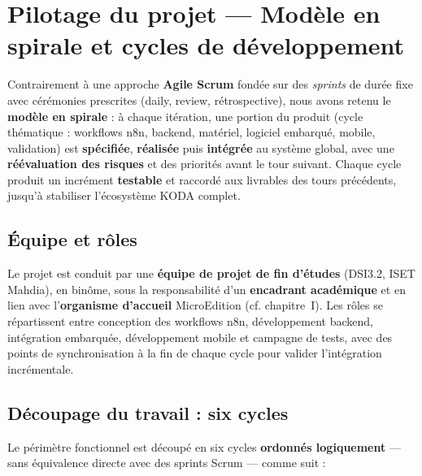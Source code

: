 \documentclass[a4paper,12pt]{report}
\begin{document}
	\section{Pilotage du projet — Modèle en spirale et cycles de développement}
	
	Contrairement à une approche \textbf{Agile Scrum} fondée sur des \textit{sprints}
	de durée fixe avec cérémonies prescrites (daily, review, rétrospective), nous avons
	retenu le \textbf{modèle en spirale} : à chaque itération, une portion du produit
	(cycle thématique : workflows n8n, backend, matériel, logiciel embarqué, mobile,
	validation) est \textbf{spécifiée}, \textbf{réalisée} puis \textbf{intégrée} au
	système global, avec une \textbf{réévaluation des risques} et des priorités avant le
	tour suivant. Chaque cycle produit un incrément \textbf{testable} et raccordé aux
	livrables des tours précédents, jusqu'à stabiliser l'écosystème KODA complet.
	
	\subsection{Équipe et rôles}
	
	Le projet est conduit par une \textbf{équipe de projet de fin d'études} (DSI3.2,
	ISET Mahdia), en binôme, sous la responsabilité d'un \textbf{encadrant académique}
	et en lien avec l'\textbf{organisme d'accueil} MicroEdition (cf. chapitre~I). Les
	rôles se répartissent entre conception des workflows n8n, développement backend,
	intégration embarquée, développement mobile et campagne de tests, avec des points
	de synchronisation à la fin de chaque cycle pour valider l'intégration incrémentale.
	
	\subsection{Découpage du travail : six cycles}
	
	Le périmètre fonctionnel est découpé en six cycles \textbf{ordonnés logiquement} —
	sans équivalence directe avec des sprints Scrum — comme suit :
	
\end{document}
